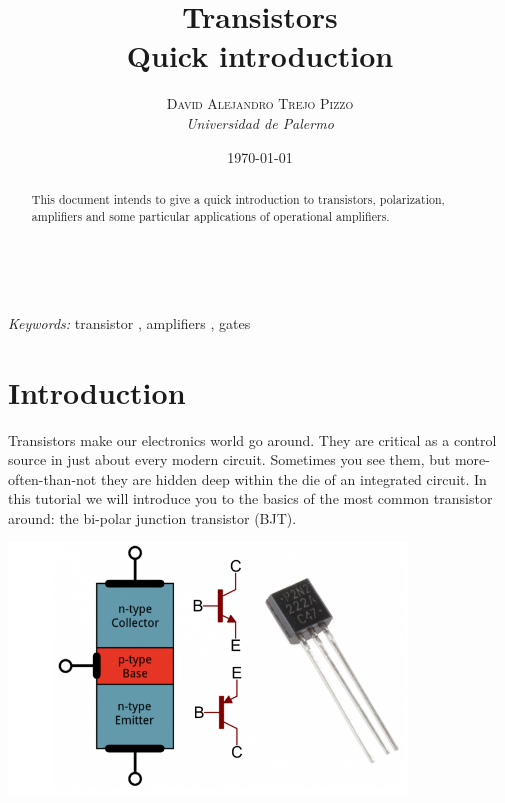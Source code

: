 \documentclass[a4paper, 11pt]{article} %
\title{\textbf{Transistors}\\ %
Quick introduction} %
\author{\textsc{David Alejandro Trejo Pizzo} %
\\{\textit{Universidad de Palermo}}} %
\date{\today} %
\makeatletter
\renewcommand{\maketitle}{ %
\begin{flushright} %
{\LARGE\@title} %

\vspace{50pt} %

{\large\@author} %
\\\@date %

\vspace{40pt} %
\end{flushright}
}
\makeatother
\begin{document}
\maketitle %



\begin{abstract}
This document intends to give a quick introduction to transistors, polarization, amplifiers and some particular applications of operational amplifiers.
\end{abstract}

\hspace*{3,6mm}\textit{Keywords:} transistor , amplifiers , gates%

\vspace{30pt} %


\section*{Introduction}

Transistors make our electronics world go around. They are critical as a control source in just about every modern circuit. Sometimes you see them, but more-often-than-not they are hidden deep within the die of an integrated circuit. In this tutorial we will introduce you to the basics of the most common transistor around: the bi-polar junction transistor (BJT).

\begin{center}
\includegraphics[width=300pt]{tran1}
\end{center}
\end{document}
